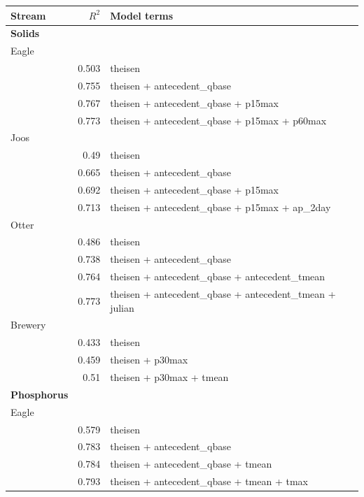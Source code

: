 \documentclass[12pt]{article}
\begin{document}
\begin{table}[h]
    \begin{center}
    \begin{tabular}{lrl}
    Stream & $R^2$ & Model terms \\
    \hline
    \hspace{-3mm} \textbf{Solids} & & \\
    Eagle & & \\
    & 0.503 & theisen\\
    & 0.755 & theisen + antecedent\_qbase\\
    & 0.767 & theisen + antecedent\_qbase + p15max\\
    & 0.773 & theisen + antecedent\_qbase + p15max + p60max\\
    
    Joos & & \\
    & 0.49 & theisen\\
    & 0.665 & theisen + antecedent\_qbase\\
    & 0.692 & theisen + antecedent\_qbase + p15max\\
    & 0.713 & theisen + antecedent\_qbase + p15max + ap\_2day\\

    Otter & & \\
    & 0.486 & theisen\\
    & 0.738 & theisen + antecedent\_qbase\\
    & 0.764 & theisen + antecedent\_qbase + antecedent\_tmean\\
    & 0.773 & theisen + antecedent\_qbase + antecedent\_tmean + julian\\

    Brewery & & \\
    & 0.433 & theisen\\
    & 0.459 & theisen + p30max\\
    & 0.51 & theisen + p30max + tmean
    \vspace{3mm}\\

    \hspace{-3mm} \textbf{Phosphorus} & & \\
    Eagle & & \\
    & 0.579 & theisen\\
    & 0.783 & theisen + antecedent\_qbase\\
    & 0.784 & theisen + antecedent\_qbase + tmean\\
    & 0.793 & theisen + antecedent\_qbase + tmean + tmax\\
    

\end{tabular}
\end{center}
\end{table}
\end{document}
